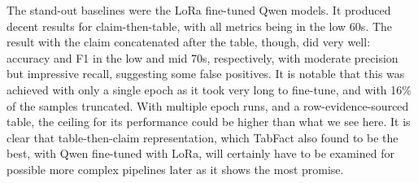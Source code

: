 \vspace{\baselineskip}
\noindent The stand-out baselines were the LoRa fine-tuned Qwen models. It produced decent results for claim-then-table, with all metrics being in the low 60s. The result with the claim concatenated after the table, though, did very well: accuracy and F1 in the low and mid 70s, respectively, with moderate precision but impressive recall, suggesting some false positives. It is notable that this was achieved with only a single epoch as it took very long to fine-tune, and with 16\% of the samples truncated. With multiple epoch runs, and a row-evidence-sourced table, the ceiling for its performance could be higher than what we see here. It is clear that table-then-claim representation, which TabFact also found to be the best, with Qwen fine-tuned with LoRa, will certainly have to be examined for possible more complex pipelines later as it shows the most promise. 
